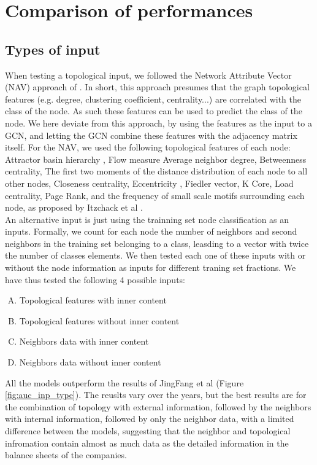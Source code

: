\section{Comparison of performances}
\subsection{Types of input}
When testing a topological input, we followed the Network Attribute Vector (NAV) approach of \cite{rosen2016topological,naaman2019edge}. In short, this approach presumes that the graph topological features (e.g. degree, clustering coefficient, centrality...) are correlated with the class of the node. As such these features can be used to predict the class of the node. We here deviate from this approach, by using the features as the input to a GCN, and letting the GCN combine these features with the adjacency matrix itself. For the NAV, we used the following topological features of each node: Attractor basin hierarchy \cite{muchnik2007self}, Flow measure \cite{rosen2014directionality} Average neighbor degree, Betweenness centrality, The first two moments of the distance distribution of each node to all other nodes, Closeness centrality, Eccentricity , Fiedler vector, K Core, Load centrality, Page Rank, and the frequency of small scale motifs surrounding each node, as proposed by Itzchack et al \cite{itzhack2007optimal}.
\\An alternative input is just using the trainning set node classification as an inputs. Formally, we count for each node the number of neighbors and second neighbors in the training set belonging to a class, leasding to a vector with twice the number of classes elements. We then tested each one of these inputs with or without the node information as inputs for different traning set fractions. We have thus tested the following 4 possible inputs:
\begin{enumerate}[A)]
\item   Topological features with inner content
\item   Topological features without inner content
\item   Neighbors data with inner content
\item   Neighbors data without inner content
\end{enumerate}
All the models outperform the results of JingFang et al (Figure \ref{fig:auc_inp_type}). The reuslts vary over the years, but the best results are for the combination of topology with external information, followed by the neighbors with internal information, followed by only the neighbor data, with a limited difference between the models, suggesting that the neighbor and topological infromation contain almost as much data as the detailed information in the balance sheets of the companies.

